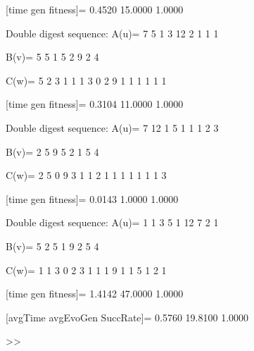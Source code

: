 [time gen fitness]=
    0.4520   15.0000    1.0000

Double digest sequence:
A(u)=
     7     5     1     3    12     2     1     1     1

B(v)=
     5     5     1     5     2     9     2     4

C(w)=
     5     2     3     1     1     1     3     0     2     9     1     1     1     1     1     1

[time gen fitness]=
    0.3104   11.0000    1.0000

Double digest sequence:
A(u)=
     7    12     1     5     1     1     1     2     3

B(v)=
     2     5     9     5     2     1     5     4

C(w)=
     2     5     0     9     3     1     1     2     1     1     1     1     1     1     1     3

[time gen fitness]=
    0.0143    1.0000    1.0000

Double digest sequence:
A(u)=
     1     1     3     5     1    12     7     2     1

B(v)=
     5     2     5     1     9     2     5     4

C(w)=
     1     1     3     0     2     3     1     1     1     9     1     1     5     1     2     1

[time gen fitness]=
    1.4142   47.0000    1.0000

[avgTime  avgEvoGen  SuccRate]=
    0.5760   19.8100    1.0000

>> 